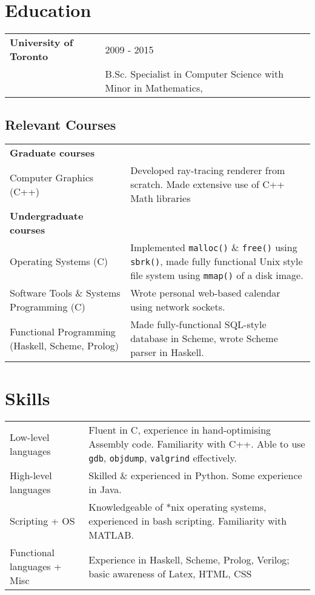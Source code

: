 \section*{Education}
\begin{tabular}{P{4.5cm}|p{11.25cm}}
\textbf{University of Toronto} & 2009 - 2015\\
& B.Sc. Specialist in Computer Science with Minor in Mathematics, 
\end{tabular}

\subsection*{Relevant Courses}
\begin{tabular}{P{4.5cm}|p{10.5cm}}
\textbf{Graduate courses} & \\
Computer Graphics (C++) & Developed ray-tracing renderer from scratch. Made extensive use of C++ Math libraries\\
\hline
\textbf{Undergraduate courses} & \\
Operating Systems (C) & Implemented \texttt{malloc()} \& \texttt{free()} using \texttt{sbrk()}, made fully functional Unix style file system using \texttt{mmap()} of a disk image. \\
Software Tools \& Systems Programming (C) & Wrote personal web-based calendar using network sockets.\\
Functional Programming (Haskell, Scheme, Prolog) & Made fully-functional SQL-style database in Scheme, wrote Scheme parser in Haskell.
\end{tabular}

\section*{Skills}
\begin{tabular}{P{4.5cm}|p{10.5cm}}
Low-level languages & Fluent in C, experience in hand-optimising Assembly code. Familiarity with C++. Able to use \texttt{gdb}, \texttt{objdump}, \texttt{valgrind} effectively.\\
High-level languages & Skilled \& experienced in Python. Some experience in Java. \\
Scripting + OS & Knowledgeable of *nix operating systems, experienced in bash scripting. Familiarity with MATLAB.\\
Functional languages + Misc & Experience in Haskell, Scheme, Prolog, Verilog; basic awareness of Latex, HTML, CSS
\end{tabular}

